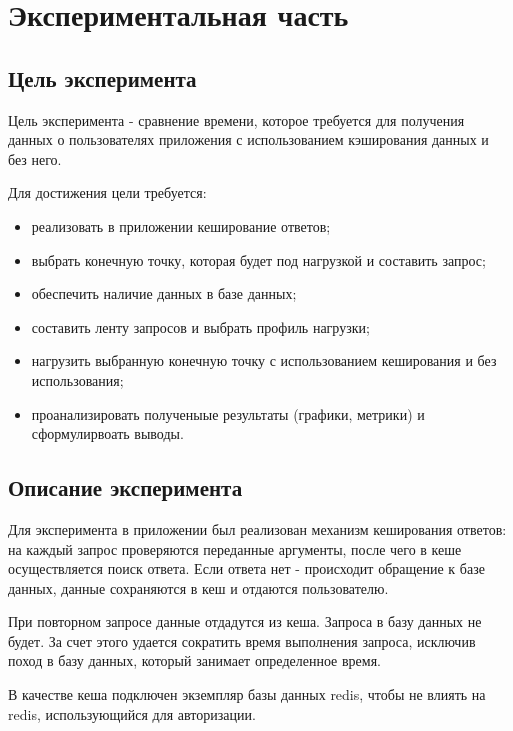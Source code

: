 \chapter{Экспериментальная часть}

\section{Цель эксперимента}

Цель эксперимента - сравнение времени, которое требуется для получения данных о пользователях приложения с использованием кэширования данных и без него.  

Для достижения цели требуется:
\begin{itemize}
\item реализовать в приложении кеширование ответов;
\item выбрать конечную точку, которая будет под нагрузкой и составить запрос;
\item обеспечить наличие данных в базе данных;
\item составить ленту запросов и выбрать профиль нагрузки;
\item нагрузить выбранную конечную точку с использованием кеширования и без использования;
\item проанализировать полученыые результаты (графики, метрики) и сформулирвоать выводы.
\end{itemize}

\section{Описание эксперимента}
Для эксперимента в приложении был реализован механизм кеширования ответов: на каждый запрос проверяются переданные аргументы, после чего в кеше осуществляется поиск ответа. Если ответа нет - происходит обращение к базе данных, данные сохраняются в кеш и отдаются пользователю. 

При повторном запросе данные отдадутся из кеша. Запроса в базу данных не будет. 
За счет этого удается сократить время выполнения запроса, исключив поход в базу данных, который занимает определенное время.  

В качестве кеша подключен экземпляр базы данных redis, чтобы не влиять на redis, использующийся для авторизации.  

